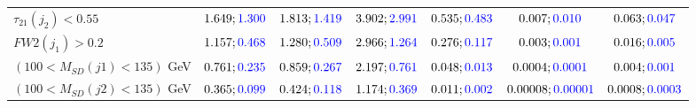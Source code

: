 \begin{landscape}
\begin{table}
\begin{tabular}{lcccccc}
			\rowcolor{black!7}$\tau_{21}(j_2)<0.55$ &$1.649;\textcolor{blue}{1.300}$ &$1.813;\textcolor{blue}{1.419}$ &$3.902;\textcolor{blue}{2.991}$&$0.535;\textcolor{blue}{0.483}$&$0.007;\textcolor{blue}{0.010}$&$0.063;\textcolor{blue}{0.047}$\\
			$FW2(j_1)>0.2$ &$1.157;\textcolor{blue}{0.468}$ &$1.280;\textcolor{blue}{0.509}$&$2.966;\textcolor{blue}{1.264}$&$0.276;\textcolor{blue}{0.117}$&$0.003;\textcolor{blue}{0.001}$&$0.016;\textcolor{blue}{0.005}$\\
			\rowcolor{black!7}$(100<M_{SD}(j1)<135)$ GeV& $0.761;\textcolor{blue}{0.235}$&$0.859;\textcolor{blue}{0.267}$&$2.197;\textcolor{blue}{0.761}$&$0.048;\textcolor{blue}{0.013}$&$0.0004;\textcolor{blue}{0.0001}$&$0.004;\textcolor{blue}{0.001}$\\
			$(100<M_{SD}(j2)<135)$ GeV &$0.365;\textcolor{blue}{0.099}$ &$0.424;\textcolor{blue}{0.118}$ &$1.174;\textcolor{blue}{0.369}$&$0.011;\textcolor{blue}{0.002}$&$0.00008;\textcolor{blue}{0.00001}$&$0.0008;\textcolor{blue}{0.0003}$\\
			\bottomrule
		\end{tabular}
	\end{table}


\end{landscape}
